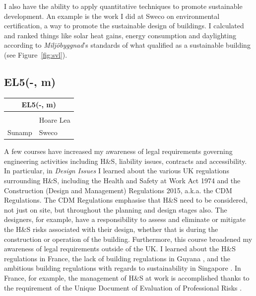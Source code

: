I also have the ability to apply quantitative techniques to promote sustainable development.
An example is the work I did at Sweco on environmental certification, a way to promote the sustainable design of buildings.
I calculated and ranked things like solar heat gains, energy consumption and daylighting according to \textit{Miljöbyggnad}'s standards of what qualified as a sustainable building (see Figure~\ref{fig:svl}).








\subsection*{EL5(-, m)}

\begin{table}
	\begin{tabular}{|ll|}
		\hline
		\multicolumn{2}{|c|}{\cellcolor[HTML]{F8A102}\textbf{EL5(-, m)} \master} \\ \hline
		\PC & \DI \\
		\ISE & Hoare Lea \\
		Sunamp & Sweco \\ \hline
	\end{tabular}
\end{table}

A few courses have increased my awareness of legal requirements governing engineering activities including H{\&}S, liability issues, contracts and accessibility.
In particular, in \textit{Design Issues} I learned about the various UK regulations surrounding H\&S, including the Health and Safety at Work Act 1974 and the Construction (Design and Management) Regulations 2015, a.k.a. the CDM Regulations.
The CDM Regulations emphasise that H\&S need to be considered, not just on site, but throughout the planning and design stages also.
The designers, for example, have a responsibility to assess and eliminate or mitigate the H\&S risks associated with their design, whether that is during the construction or operation of the building.
Furthermore, this course broadened my awareness of legal requirements outside of the UK.
I learned about the H\&S regulations in France, the lack of building regulations in Guyana \citep{Guyana_regulations}, and the ambitious building regulations with regards to sustainability in Singapore \citep{Singapore2008}.
In France, for example, the management of H{\&}S at work is accomplished thanks to the requirement of the Unique Document of Evaluation of Professional Risks \citep{DU2009}.

